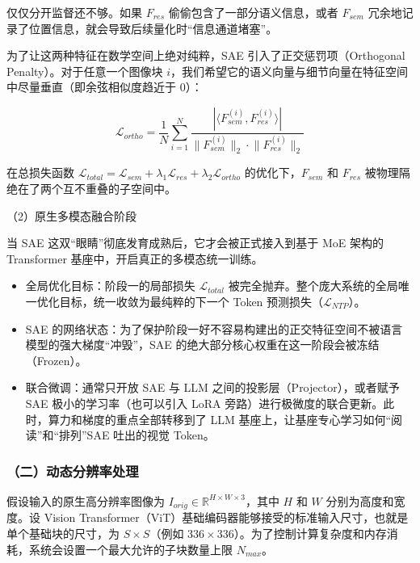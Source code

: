 仅仅分开监督还不够。如果 \(F_{res}\) 偷偷包含了一部分语义信息，或者 \(F_{sem}\) 冗余地记录了位置信息，就会导致后续量化时``信息通道堵塞''。

为了让这两种特征在数学空间上绝对纯粹，SAE 引入了正交惩罚项（Orthogonal Penalty）。对于任意一个图像块 \(i\)，我们希望它的语义向量与细节向量在特征空间中尽量垂直（即余弦相似度趋近于 0）：

\[
\mathcal{L}_{ortho}=\frac{1}{N}\sum_{i=1}^{N}
\frac{|\langle F_{sem}^{(i)},F_{res}^{(i)}\rangle|}
{\lVert F_{sem}^{(i)}\rVert_2\cdot \lVert F_{res}^{(i)}\rVert_2}
\]

在总损失函数 \(\mathcal{L}_{total}=\mathcal{L}_{sem}+\lambda_1\mathcal{L}_{res}+\lambda_2\mathcal{L}_{ortho}\) 的优化下，\(F_{sem}\) 和 \(F_{res}\) 被物理隔绝在了两个互不重叠的子空间中。

（2）原生多模态融合阶段

当 SAE 这双``眼睛''彻底发育成熟后，它才会被正式接入到基于 MoE 架构的 Transformer 基座中，开启真正的多模态统一训练。

\begin{itemize}
\tightlist
\item
  全局优化目标：阶段一的局部损失 \(\mathcal{L}_{total}\) 被完全抛弃。整个庞大系统的全局唯一优化目标，统一收敛为最纯粹的下一个 Token 预测损失（\(\mathcal{L}_{NTP}\)）。
\item
  SAE 的网络状态：为了保护阶段一好不容易构建出的正交特征空间不被语言模型的强大梯度``冲毁''，SAE 的绝大部分核心权重在这一阶段会被冻结（Frozen）。
\item
  联合微调：通常只开放 SAE 与 LLM 之间的投影层（Projector），或者赋予 SAE 极小的学习率（也可以引入 LoRA 旁路）进行极微度的联合更新。此时，算力和梯度的重点全部转移到了 LLM 基座上，让基座专心学习如何``阅读''和``排列''SAE 吐出的视觉 Token。
\end{itemize}

\hypertarget{ux4e8cux52a8ux6001ux5206ux8fa8ux7387ux5904ux7406}{%
\subsubsection{（二）动态分辨率处理}\label{ux4e8cux52a8ux6001ux5206ux8fa8ux7387ux5904ux7406}}

假设输入的原生高分辨率图像为 \(I_{orig}\in\mathbb{R}^{H\times W\times 3}\)，其中 \(H\) 和 \(W\) 分别为高度和宽度。设 Vision Transformer（ViT）基础编码器能够接受的标准输入尺寸，也就是单个基础块的尺寸，为 \(S\times S\)（例如 \(336\times336\)）。为了控制计算复杂度和内存消耗，系统会设置一个最大允许的子块数量上限 \(N_{max}\)。


